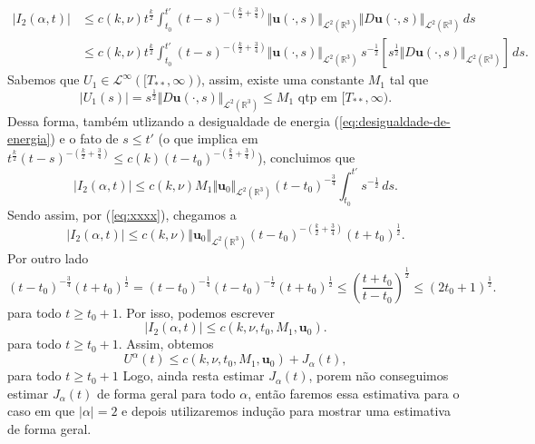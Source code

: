 \documentclass[a4paper, 11pt]{book}
\theoremstyle{definition}
\newcommand{\bR}{\mathbb{R}}
\newcommand{\bu}{\mathbf{u}}
\newcommand{\cL}{\mathcal{L}}
\begin{document}
\begin{prf}
    \[
        \begin{aligned}
            |I_2(\alpha,t)| &\leqslant c(k,\nu) t^{\frac{k}{2}} \! \int_{t_0}^{t'} (t-s)^{-\left( \frac{k}{2} + \frac{3}{4} \right)} \Vert \bu(\cdot,s) \Vert_{\cL^2(\bR^3)} \Vert D\bu(\cdot,s) \Vert_{\cL^2(\bR^3)} \,ds\\
            &\leqslant c(k,\nu)t^{\frac{k}{2}} \!\int_{t_0}^{t'} (t-s)^{-\left( \frac{k}{2} + \frac{3}{4} \right)} \Vert \bu(\cdot,s) \Vert_{\cL^2(\bR^3)} \, s^{-\frac{1}{2}} \left[ s^{\frac{1}{2}} \Vert D\bu(\cdot,s) \Vert_{\cL^2(\bR^3)} \right] \,ds.
        \end{aligned}
    \]
    Sabemos que $U_1 \in \cL^\infty([T_{**},\infty))$, assim, existe uma constante $M_1$ tal que
    \begin{equation} \label{eq:C1}
        |U_1(s)| = s^{\frac{1}{2}} \Vert D\bu(\cdot,s) \Vert_{\cL^2(\bR^3)} \leqslant M_1 \text{ qtp em } [T_{**},\infty).
    \end{equation}
    Dessa forma, também utlizando a desigualdade de energia (\ref{eq:desigualdade-de-energia}) e o fato de $s \leqslant t'$ (o que implica em $t^{\frac{k}{2}}(t-s)^{-\left( \frac{k}{2} + \frac{3}{4} \right)} \leqslant c(k)(t-t_0)^{-\left( \frac{k}{2} + \frac{3}{4} \right)}$), concluimos que
    \[
        |I_2(\alpha,t)|\leqslant c(k,\nu) M_1 \Vert \bu_0 \Vert_{\cL^2(\bR^3)} (t-t_0)^{-\frac{3}{4}} \int_{t_0}^{t'} s^{-\frac{1}{2}} \,ds.
    \]
    Sendo assim, por (\ref{eq:xxxx}), chegamos a
    \[
        |I_2(\alpha,t)|\leqslant c(k,\nu) \Vert \bu_0 \Vert_{\cL^2(\bR^3)} (t-t_0)^{-\left( \frac{k}{2} + \frac{3}{4} \right)} (t + t_0)^{\frac{1}{2}}.
    \]
    Por outro lado
    \[
        (t - t_0)^{-\frac{3}{4}} (t + t_0)^{\frac{1}{2}} = (t - t_0)^{-\frac{1}{4}} (t - t_0)^{-\frac{1}{2}} (t + t_0)^{\frac{1}{2}} \leqslant \left( \frac{t + t_0}{t- t_0} \right)^{\frac{1}{2}} \leqslant (2t_0 + 1)^{\frac{1}{2}}.
    \]
    para todo $t \geqslant t_0 + 1$.
    Por isso, podemos escrever
    \begin{equation} \label{eq:W2}
        |I_2(\alpha,t)|\leqslant c(k,\nu, t_0, M_1, \bu_0).
    \end{equation}
    para todo $t \geqslant t_0 + 1$.
    Assim, obtemos
    \begin{equation} \label{eq:4.10}
        U^\alpha(t) \leqslant c(k,\nu,t_0,M_1,\bu_0) + J_\alpha(t),
    \end{equation}
    para todo $t \geqslant t_0 + 1$
    Logo, ainda resta estimar $J_\alpha(t)$, porem não conseguimos estimar $J_\alpha(t)$ de forma geral para todo $\alpha$, então faremos essa estimativa para o caso em que $|\alpha| = 2$ e depois utilizaremos indução para mostrar uma estimativa de forma geral.

\end{prf}
\end{document}
